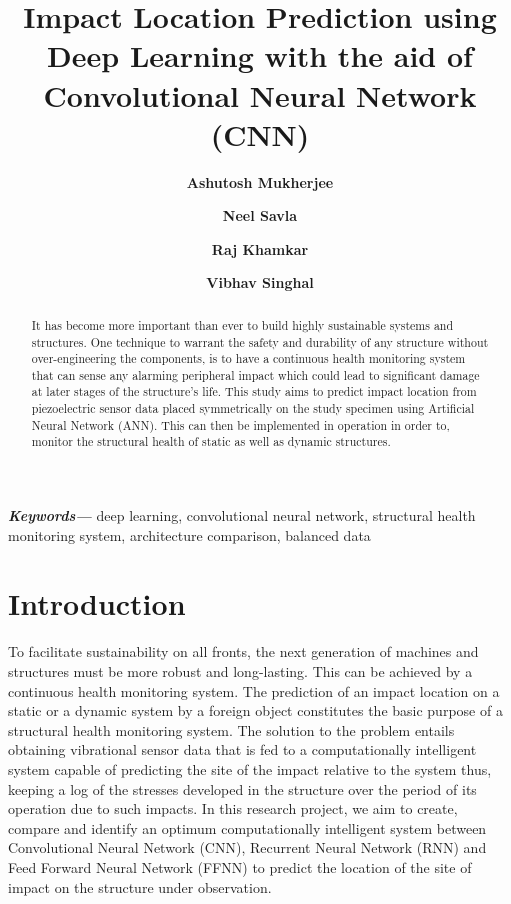 \documentclass[12pt]{article}
\def\reporttitle{\textbf{Impact Location Prediction using Deep Learning with the aid of Convolutional Neural Network (CNN)}}
\providecommand{\keywords}[1]
{
  \small	
  \textbf{\textit{Keywords---}} #1
}
\begin{document}
\title{\reporttitle}
\author[1]{\textbf{Ashutosh Mukherjee}}
\author[2]{\textbf{Neel Savla}}
\author[2]{\textbf{Raj Khamkar}}
\author[2]{\textbf{Vibhav Singhal}}
\date{\vspace{-5ex}} %
\maketitle

\begin{abstract}
\noindent
It has become more important than ever to build highly sustainable systems and structures. One technique to warrant the safety and durability of any structure without over-engineering the components, is to have a continuous health monitoring system that can sense any alarming peripheral impact which could lead to significant damage at later stages of the structure's life. This study aims to predict impact location from piezoelectric sensor data placed symmetrically on the study specimen using Artificial Neural Network (ANN). This can then be implemented in operation in order to, monitor the structural health of static as well as dynamic structures. 
\end{abstract} \hspace{10 pt}

\keywords{deep learning, convolutional neural network, structural health monitoring system, architecture comparison, balanced data}

\section{Introduction}

\setlength{\parindent}{20pt}
To facilitate sustainability on all fronts, the next generation of machines and structures must be more robust and long-lasting. This can be achieved by a continuous health monitoring system. The prediction of an impact location on a static or a dynamic system by a foreign object constitutes the basic purpose of a structural health monitoring system\cite{1}\cite{2}. The solution to the problem entails obtaining vibrational sensor data that is fed to a computationally intelligent system capable of predicting the site of the impact relative to the system thus, keeping a log of the stresses developed in the structure over the period of its operation due to such impacts. In this research project, we aim to create, compare and identify an optimum computationally intelligent system between Convolutional Neural Network (CNN)\cite{3}, Recurrent Neural Network (RNN)\cite{4} and Feed Forward Neural Network (FFNN)\cite{5} to predict the location of the site of impact on the structure under observation.
\end{document}
